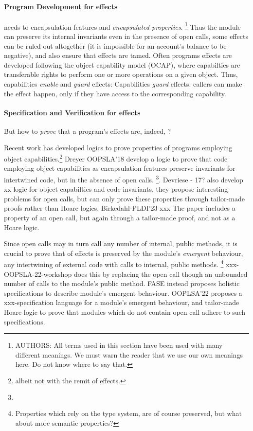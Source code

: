 \paragraph{Program Development for \tamed effects} %
needs to
 encapsulation features and \emph{encapsulated properties}.
\footnote{AUTHORS: All terms used in this section have been used with many different meanings. 
We must warn the reader that we use our own meanings here. 
Do not know where to say that.}
Thus the module can preserve its internal invariants  even in the presence of open calls,
some effects can be ruled out altogether (\eg it is impossible for an account's balance to be negative), and
also ensure that effects are tamed.
 Often  programs \taming effects are developed following the object capability model (OCAP)\cite{Miller}, where  
 capabilties are transferable rights to perform one or more operations on a given object.
Thus, capabilities \emph{enable} and  \emph{guard} effects:   
Capabilities \emph{guard} effects: callers can make the effect   happen, only if they have access to the corresponding capability.
 
 
\paragraph{Specification and Verification  for \tamed effects} But how to \emph{prove} that a program's effects are, indeed, \tamed?
 
Recent work has developed logics to prove properties of programs employing object capabilities.\footnote{albeit not with the remit of   \tamed effects.}
Dreyer OOPSLA'18 develop a logic to prove that   code employing object capabilities as encapsulation features preserve invariants for intertwined code, but in the absence of open calls. 
 \footnote{}.
Devriese - 17? also develop xx logic for object capabilties and code invariants, they propose interesting problems for open calls, 
but can only prove these properties through tailor-made proofs rather than Hoare logics.
Birkedahl-PLDI'23 xxx The paper includes a property of an open call, but again through a tailor-made proof, and not as a Hoare logic.


Since open calls may in turn call any number of internal, public methods, 
it is crucial  to prove that \taming of effects is preserved by the module's 
\emph{emergent} behaviour, \ie any intertwining of external code with calls to internal, public methods.
\footnote{Properties which rely on the type system, are of course preserved, but what about more semantic properties?}
xxx-OOPSLA-22-workshop does this by replacing the open call though an unbounded number of calls to the module's public method.
 FASE instead proposes holistic specifications to describe   module's emergent behaviour. 
 OOPLSA'22 proposes a xxx-specification language for a module's emergent behaviour, and  tailor-made Hoare logic to prove that modules which do not contain open call adhere to such specifications.



